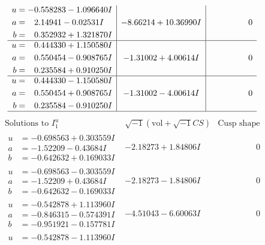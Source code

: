 \documentclass[1p]{elsarticle_modified}
\theoremstyle{definition}
\newcommand{\I}{\sqrt{-1}}
\begin{document}
$$\begin{array}{c|c|c}
\begin{aligned}
u &= -0.558283 - 1.096640 I \\
a &= \phantom{-}2.14941 - 0.02531 I \\
b &= \phantom{-}0.352932 + 1.321870 I\end{aligned}
 & -8.66214 + 10.36990 I & \phantom{-0.000000 } 0 \\ \hline\begin{aligned}
u &= \phantom{-}0.444330 + 1.150580 I \\
a &= \phantom{-}0.550454 - 0.908765 I \\
b &= \phantom{-}0.235584 + 0.910250 I\end{aligned}
 & -1.31002 + 4.00614 I & \phantom{-0.000000 } 0 \\ \hline\begin{aligned}
u &= \phantom{-}0.444330 - 1.150580 I \\
a &= \phantom{-}0.550454 + 0.908765 I \\
b &= \phantom{-}0.235584 - 0.910250 I\end{aligned}
 & -1.31002 - 4.00614 I & \phantom{-0.000000 } 0\\
 \hline 
 \end{array}$$\newpage$$\begin{array}{c|c|c}  
\text{Solutions to }I^u_{1}& \I (\text{vol} + \sqrt{-1}CS) & \text{Cusp shape}\\
 \hline 
\begin{aligned}
u &= -0.698563 + 0.303559 I \\
a &= -1.52209 - 0.43684 I \\
b &= -0.642632 + 0.169033 I\end{aligned}
 & -2.18273 + 1.84806 I & \phantom{-0.000000 } 0 \\ \hline\begin{aligned}
u &= -0.698563 - 0.303559 I \\
a &= -1.52209 + 0.43684 I \\
b &= -0.642632 - 0.169033 I\end{aligned}
 & -2.18273 - 1.84806 I & \phantom{-0.000000 } 0 \\ \hline\begin{aligned}
u &= -0.542878 + 1.113960 I \\
a &= -0.846315 - 0.574391 I \\
b &= -0.951921 - 0.157781 I\end{aligned}
 & -4.51043 - 6.60063 I & \phantom{-0.000000 } 0 \\ \hline\begin{aligned}
u &= -0.542878 - 1.113960 I \\

\end{aligned}
\end{array}$$
\end{document}

